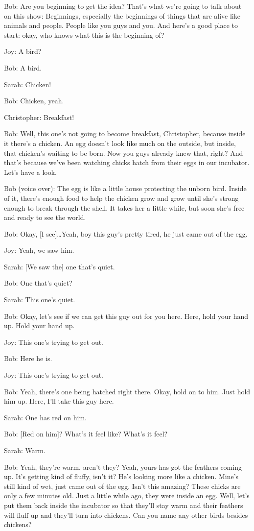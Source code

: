 Bob: Are you beginning to get the idea? That's what we're going to talk about on this show: Beginnings, especially the beginnings of things that are alive like animals and people. People like you guys and you. And here's a good place to start: okay, who knows what this is the beginning of?

Joy: A bird?

Bob: A bird.

Sarah: Chicken!

Bob: Chicken, yeah.

Christopher: Breakfast!

Bob: Well, this one's not going to become breakfast, Christopher, because inside it there's a chicken. An egg doesn't look like much on the outside, but inside, that chicken's waiting to be born. Now you guys already knew that, right? And that's because we've been watching chicks hatch from their eggs in our incubator. Let's have a look.

Bob (voice over): The egg is like a little house protecting the unborn bird. Inside of it, there's enough food to help the chicken grow and grow until she's strong enough to break through the shell. It takes her a little while, but soon she's free and ready to see the world.

Bob: Okay, [I see]\dots Yeah, boy this guy's pretty tired, he just came out of the egg.

Joy: Yeah, we saw him.

Sarah: [We saw the] one that's quiet.

Bob: One that's quiet?

Sarah: This one's quiet.

Bob: Okay, let's see if we can get this guy out for you here. Here, hold your hand up. Hold your hand up.

Joy: This one's trying to get out.

Bob: Here he is.

Joy: This one's trying to get out.

Bob: Yeah, there's one being hatched right there. Okay, hold on to him. Just hold him up. Here, I'll take this guy here.

Sarah: One has red on him.

Bob: [Red on him]? What's it feel like? What's it feel?

Sarah: Warm.

Bob: Yeah, they're warm, aren't they? Yeah, yours has got the feathers coming up. It's getting kind of fluffy, isn't it? He's looking more like a chicken. Mine's still kind of wet, just came out of the egg. Isn't this amazing? These chicks are only a few minutes old. Just a little while ago, they were inside an egg. Well, let's put them back inside the incubator so that they'll stay warm and their feathers will fluff up and they'll turn into chickens. Can you name any other birds besides chickens?

